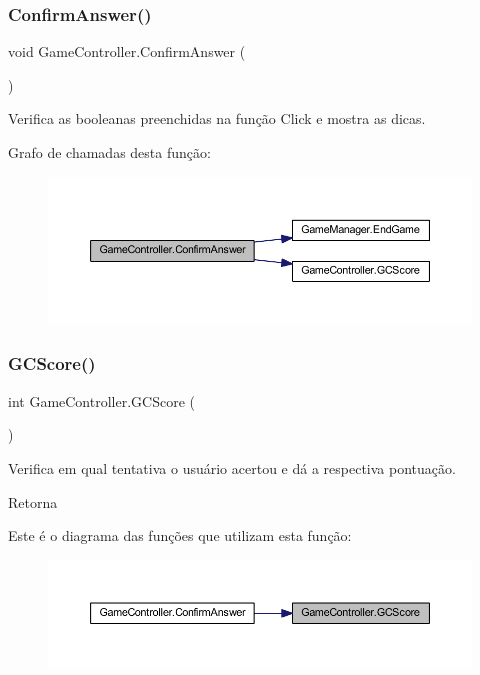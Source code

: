 \subsubsection{ConfirmAnswer()}
{\footnotesize\ttfamily void Game\+Controller.\+Confirm\+Answer (\begin{DoxyParamCaption}{ }\end{DoxyParamCaption})}



Verifica as booleanas preenchidas na função \textquotesingle{}Click\textquotesingle{} e mostra as dicas. 

Grafo de chamadas desta função\+:
\nopagebreak
\begin{figure}[H]
\begin{center}
\leavevmode
\includegraphics[width=350pt]{class_game_controller_a67f2b0ef6aad12da8f8c2911577e750d_cgraph}
\end{center}
\end{figure}
\mbox{\label{class_game_controller_a2f94eec7d5eda41c2a7d573c98f58558}} 
\subsubsection{GCScore()}
{\footnotesize\ttfamily int Game\+Controller.\+G\+C\+Score (\begin{DoxyParamCaption}{ }\end{DoxyParamCaption})}



Verifica em qual tentativa o usuário acertou e dá a respectiva pontuação. 

\begin{DoxyReturn}{Retorna}

\end{DoxyReturn}
Este é o diagrama das funções que utilizam esta função\+:
\nopagebreak
\begin{figure}[H]
\begin{center}
\leavevmode
\includegraphics[width=350pt]{class_game_controller_a2f94eec7d5eda41c2a7d573c98f58558_icgraph}
\end{center}
\end{figure}
\mbox{\label{class_game_controller_acd3c2bfd80eed314ce9b253d9fa3ca71}} 
